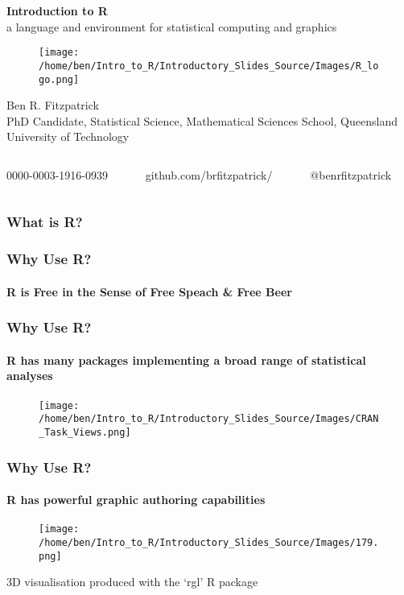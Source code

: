 \documentclass[xcolor=dvipsnames]{beamer}
\begin{document}
\begin{frame} %
\textbf{\huge Introduction to R}\\
a language and environment for statistical computing and graphics %

\begin{figure}
\texttt{[image: /home/ben/Intro\_to\_R/Introductory\_Slides\_Source/Images/R\_logo.png]}
\end{figure}
\small Ben R. Fitzpatrick\\
\tiny PhD Candidate, Statistical Science, Mathematical Sciences School, Queensland University of Technology
\newline
\begin{columns}
\begin{column}{3cm}
\tiny 0000-0003-1916-0939
\end{column}
\begin{column}{3cm}
\tiny github.com/brfitzpatrick/
\end{column}
\begin{column}{3cm}
\tiny @benrfitzpatrick
\end{column}
\end{columns}
\end{frame}



\begin{frame} 
\frametitle{What is R?}
\end{frame}

\begin{frame} 
\frametitle{Why Use R?}
\framesubtitle{R is Free in the Sense of Free Speach \& Free Beer}
\end{frame}

\begin{frame} 
\frametitle{Why Use R?}
\framesubtitle{R has many packages implementing a broad range of statistical analyses}

\begin{figure}
\texttt{[image: /home/ben/Intro\_to\_R/Introductory\_Slides\_Source/Images/CRAN\_Task\_Views.png]}
\end{figure}

\end{frame}

\begin{frame} 
\frametitle{Why Use R?}
\framesubtitle{R has powerful graphic authoring capabilities}

\begin{figure}
\texttt{[image: /home/ben/Intro\_to\_R/Introductory\_Slides\_Source/Images/179.png]}
\end{figure}

\tiny 3D visualisation produced with the `rgl' R package

\end{frame}
\end{document}
